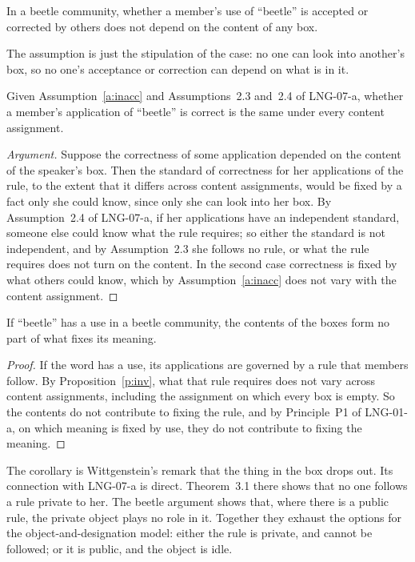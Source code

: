 \documentclass{situationist-preprint}
\begin{document}
\begin{assumption}[Inaccessibility]\label{a:inacc}
In a beetle community, whether a member's use of \enquote{beetle} is accepted or corrected by others does not depend on the content of any box.
\end{assumption}

The assumption is just the stipulation of the case: no one can look into another's box, so no one's acceptance or correction can depend on what is in it.

\begin{proposition}[Invariance]\label{p:inv}
Given Assumption~\ref{a:inacc} and Assumptions~2.3 and~2.4 of LNG-07-a, whether a member's application of \enquote{beetle} is correct is the same under every content assignment.
\end{proposition}

\begin{proof}[Argument]
Suppose the correctness of some application depended on the content of the speaker's box. Then the standard of correctness for her applications of the rule, to the extent that it differs across content assignments, would be fixed by a fact only she could know, since only she can look into her box. By Assumption~2.4 of LNG-07-a, if her applications have an independent standard, someone else could know what the rule requires; so either the standard is not independent, and by Assumption~2.3 she follows no rule, or what the rule requires does not turn on the content. In the second case correctness is fixed by what others could know, which by Assumption~\ref{a:inacc} does not vary with the content assignment.
\end{proof}

\begin{corollary}\label{c:drop}
If \enquote{beetle} has a use in a beetle community, the contents of the boxes form no part of what fixes its meaning.
\end{corollary}

\begin{proof}
If the word has a use, its applications are governed by a rule that members follow. By Proposition~\ref{p:inv}, what that rule requires does not vary across content assignments, including the assignment on which every box is empty. So the contents do not contribute to fixing the rule, and by Principle~P1 of LNG-01-a, on which meaning is fixed by use, they do not contribute to fixing the meaning.
\end{proof}

The corollary is Wittgenstein's remark that the thing in the box drops out. Its connection with LNG-07-a is direct. Theorem~3.1 there shows that no one follows a rule private to her. The beetle argument shows that, where there is a public rule, the private object plays no role in it. Together they exhaust the options for the object-and-designation model: either the rule is private, and cannot be followed; or it is public, and the object is idle.
\end{document}
